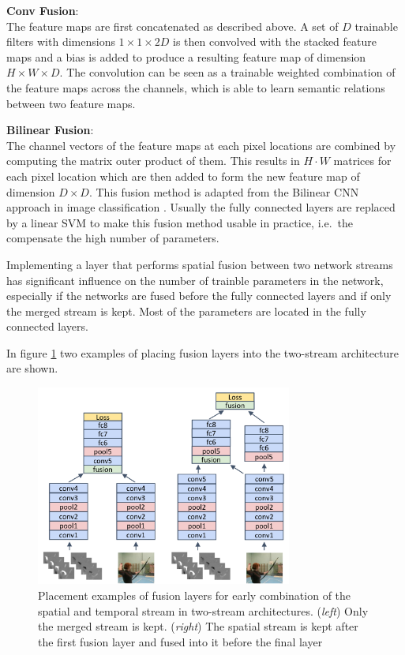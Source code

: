 \textbf{Conv Fusion}:\\
The feature maps are first concatenated as described above. A set of $D$ trainable filters with dimensions $1 \times 1 \times 2D$ is then convolved with the stacked feature maps and a bias is added to produce a resulting feature map of dimension $H \times W \times D$.
The convolution can be seen as a trainable weighted combination of the feature maps across the channels, which is able to learn semantic relations between two feature maps.

\textbf{Bilinear Fusion}:\\
The channel vectors of the feature maps at each pixel locations are combined by computing the matrix outer product of them. This results in $H \cdot W$ matrices for each pixel location which are then added to form the new feature map of dimension $D \times D$.
This fusion method is adapted from the Bilinear CNN approach in image classification \cite{lin_bilinear_2015a}.
Usually the fully connected layers are replaced by a linear SVM to make this fusion method usable in practice, i.e.\ the compensate the high number of parameters.

Implementing a layer that performs spatial fusion between two network streams has significant influence on the number of trainble parameters in the network, especially if the networks are fused before the fully connected layers and if only the merged stream is kept. Most of the parameters are located in the fully connected layers.

In figure \ref{fig:streamfusion_layerplacement} two examples of placing fusion layers into the two-stream architecture are shown.

\begin{figure}[H]
    \centering
    \includegraphics[width=0.75\textwidth]{img_deep/streamfusion_layerplacement}
    \caption{Placement examples of fusion layers for early combination of the spatial and temporal stream in two-stream architectures. (\textit{left}) Only the merged stream is kept. (\textit{right}) The spatial stream is kept after the first fusion layer and fused into it before the final layer \cite{feichtenhofer_convolutional_2016}}
    \label{fig:streamfusion_layerplacement}
\end{figure}

